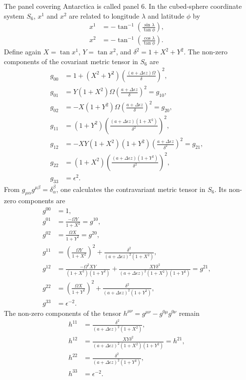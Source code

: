 \documentclass{article}
\begin{document}
The panel covering Antarctica is called panel $6$. In the cubed-sphere coordinate system $S_6$, $x^1$ and $x^2$ are related to longitude $\lambda$ and latitude $\phi$ by
\begin{align}
x^1&=- \tan^{-1} \left( \frac{\sin \lambda}{\tan \phi}  \right), \\
x^2&=- \tan^{-1} \left( \frac{\cos \lambda}{\tan \phi}  \right).
\end{align}
Define again $X=\tan x^1$, $Y=\tan x^2$, and $\delta^2=1+X^2+Y^2$. The non-zero components of the covariant metric tensor in $S_6$ are
\begin{align}
g_{00}&=1+(X^2+Y^2) \left( \frac{(a+\Delta\epsilon z)\Omega}{\delta} \right)^2, \\
g_{01}&=Y(1+X^2) \Omega \left( \frac{a+\Delta\epsilon z}{\delta} \right)^2=g_{10}, \\
g_{02}&=-X(1+Y^2) \Omega \left( \frac{a+\Delta\epsilon z}{\delta} \right)^2=g_{20}, \\
g_{11}&=(1+Y^2) \left( \frac{(a+\Delta\epsilon z)(1+X^2)}{\delta^2} \right)^2, \\
g_{12}&=-XY(1+X^2)(1+Y^2) \left( \frac{a+\Delta\epsilon z}{\delta^2} \right)^2=g_{21}, \\
g_{22}&=(1+X^2) \left( \frac{(a+\Delta\epsilon z)(1+Y^2)}{\delta^2} \right)^2, \\
g_{33}&=\epsilon^2.
\end{align}
From $g_{\mu \alpha}g^{\mu \beta}=\delta^\beta_\alpha$, one calculates the contravariant metric tensor in $S_6$. Its non-zero components are
\begin{align}
g^{00}&=1, \\
g^{01}&=\frac{-\Omega Y}{1+X^2}=g^{10}, \\
g^{02}&=\frac{\Omega X}{1+Y^2} = g^{20}, \\
g^{11}&=\left( \frac{\Omega Y}{1+X^2}\right)^2+  \frac{\delta^2}{(a+\Delta \epsilon z)^2(1+X^2)}, \\
g^{12}&=\frac{-\Omega^2 XY}{(1+X^2)(1+Y^2)}+\frac{XY\delta^2}{(a+\Delta \epsilon z)^2(1+X^2)(1+Y^2)}=g^{21}, \\
g^{22}&=\left( \frac{\Omega X}{1+Y^2} \right)^2+\frac{\delta^2}{(a+\Delta \epsilon z)^2(1+Y^2)}, \\
g^{33}&=\epsilon^{-2}.
\end{align}
The non-zero components of the tensor $h^{\mu \nu}=g^{\mu \nu}-g^{0 \mu}g^{0 \nu}$ remain
\begin{align}
h^{11}&=\frac{\delta^2}{(a+\Delta \epsilon z)^2(1+X^2)}, \\
h^{12}&=\frac{XY\delta^2}{(a+\Delta \epsilon z)^2(1+X^2)(1+Y^2)}=h^{21}, \\
h^{22}&=\frac{\delta^2}{(a+\Delta \epsilon z)^2(1+Y^2)}, \\
h^{33}&=\epsilon^{-2}.
\end{align}
\end{document}

